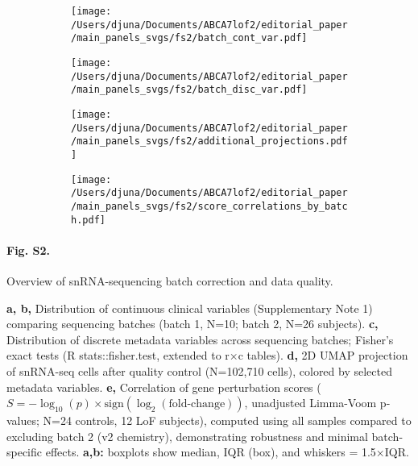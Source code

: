 % 
% 
\begin{figure}[H]
    \begin{subfigure}[t]{\textwidth}
        \caption{}
        \texttt{[image: /Users/djuna/Documents/ABCA7lof2/editorial\_paper/main\_panels\_svgs/fs2/batch\_cont\_var.pdf]}        
    \end{subfigure}
    \begin{subfigure}[t]{\textwidth}
        \caption{}
        \texttt{[image: /Users/djuna/Documents/ABCA7lof2/editorial\_paper/main\_panels\_svgs/fs2/batch\_disc\_var.pdf]}        
    \end{subfigure}  
    \begin{subfigure}[t]{\textwidth}
        \caption{}
        \texttt{[image: /Users/djuna/Documents/ABCA7lof2/editorial\_paper/main\_panels\_svgs/fs2/additional\_projections.pdf]}        
    \end{subfigure}   
    \begin{subfigure}[t]{\textwidth}
        \caption{}
        \texttt{[image: /Users/djuna/Documents/ABCA7lof2/editorial\_paper/main\_panels\_svgs/fs2/score\_correlations\_by\_batch.pdf]}        
    \end{subfigure}   
\end{figure}
\paragraph*{Fig. S2.} Overview of snRNA-sequencing batch correction and data quality.
{}
\textbf{a, b,} Distribution of continuous clinical variables (Supplementary Note 1) comparing sequencing batches (batch 1, N=10; batch 2, N=26 subjects). \textbf{c,} Distribution of discrete metadata variables across sequencing batches; Fisher’s exact tests (R stats::fisher.test, extended to r×c tables). \textbf{d,} 2D UMAP projection of snRNA-seq cells after quality control (N=102,710 cells), colored by selected metadata variables. \textbf{e,} Correlation of gene perturbation scores ($S = -\log_{10}(p)\times\text{sign}(\log_2(\text{fold-change}))$, unadjusted Limma-Voom p-values; N=24 controls, 12 LoF subjects), computed using all samples compared to excluding batch 2 (v2 chemistry), demonstrating robustness and minimal batch-specific effects. \textbf{a,b:} boxplots show median, IQR (box), and whiskers = 1.5×IQR.
